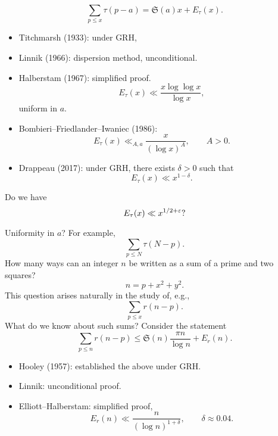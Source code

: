 \documentclass[reqno]{amsart} 
\begin{document}
\begin{equation*}
  \sum_{p \leq x}
  \tau (p - a)
  = \mathfrak{S} (a) x + E_\tau (x).
\end{equation*}
\begin{itemize}
\item Titchmarsh (1933): under GRH,
\item Linnik (1966): dispersion method, unconditional.
\item Halberstam (1967): simplified proof.
  \begin{equation*}
    E_\tau (x) \ll \frac{x \log \log x}{\log x},
  \end{equation*}
  uniform in $a$.
\item Bombieri--Friedlander--Iwaniec (1986):
  \begin{equation*}
    E_\tau (x) \ll_{A, a}
    \frac{x}{ (\log x)^A },
    \qquad
    A > 0.
  \end{equation*}
\item Drappeau (2017): under GRH, there exists $\delta > 0$ such that
  \begin{equation*}
    E_\tau (x) \ll x^{1 - \delta}.
  \end{equation*}
\end{itemize}
\begin{question}
  Do we have
  \begin{equation*}
    E_\tau (x) \ll x^{1/2 + \varepsilon}?
  \end{equation*}
\end{question}
Uniformity in $a$?  For example,
\begin{equation*}
  \sum_{p \leq N} \tau (N - p).
\end{equation*}
How many ways can an integer $n$ be written as a sum of a prime and two squares?
\begin{equation*}
  n = p + x^2 + y^2.
\end{equation*}
This question arises naturally in the study of, e.g.,
\begin{equation*}
  \sum_{p \leq x} r (n - p).
\end{equation*}
What do we know about such sums?  Consider the statement
\begin{equation*}
  \sum_{p \leq n}
  r (n - p)
  \leq
  \mathfrak{S} (n) \frac{\pi n}{ \log n}
  + E_r (n).
\end{equation*}
\begin{itemize}
\item Hooley (1957): established the above under GRH.
\item Linnik: unconditional proof.
\item Elliott--Halberstam: simplified proof,
  \begin{equation*}
    E_r (n) \ll \frac{n}{ (\log n )^{1 + \delta }},
    \qquad
    \delta \approx 0.04.
  \end{equation*}
\end{itemize}
\end{document}
